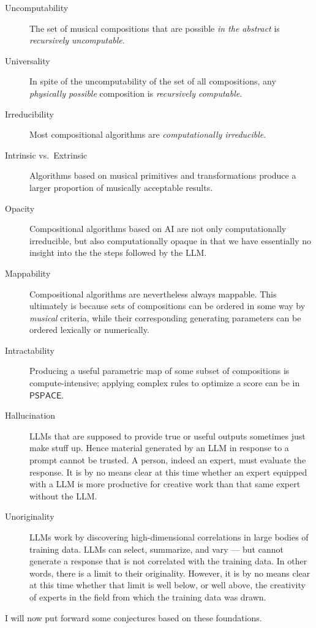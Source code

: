\documentclass[]{interact}
\theoremstyle{plain}%
\theoremstyle{definition}
\theoremstyle{remark}
\begin{document}
\begin{description}
\item[Uncomputability] The set of musical compositions that are possible \emph{in the abstract} is \emph{recursively uncomputable}.
\item[Universality] In spite of the uncomputability of the set of all compositions, any \emph{physically possible} composition is \emph{recursively computable}.
\item[Irreducibility] Most compositional algorithms are \emph{computationally irreducible}.
\item[Intrinsic vs.\ Extrinsic] Algorithms based on musical primitives and transformations produce a larger proportion of musically acceptable results.
\item[Opacity] Compositional algorithms based on AI are not only computationally irreducible, but also computationally opaque in that we have essentially no insight into the the steps followed by the LLM.
\item[Mappability] Compositional algorithms are nevertheless always mappable. This ultimately is because sets of compositions can be ordered in some way by \emph{musical} criteria, while their corresponding generating parameters can be ordered lexically or numerically.
\item[Intractability] Producing a useful parametric map of some subset of compositions is compute-intensive; applying complex rules to optimize a score can be in $\mathsf{PSPACE}$.
\item[Hallucination] LLMs that are supposed to provide true or useful outputs sometimes just make stuff up. Hence material generated by an LLM in response to a prompt cannot be trusted. A person, indeed an expert, must evaluate the response. It is by no means clear at this time whether an expert equipped with a LLM is more productive for creative work than that same expert without the LLM.
\item[Unoriginality] LLMs work by discovering high-dimensional correlations in large bodies of training data. LLMs can select, summarize, and vary --- but cannot generate a response that is not correlated with the training data. In other words, there is a limit to their originality. However, it is by no means clear at this time whether that limit is well below, or well above, the creativity of experts in the field from which the training data was drawn.
\end{description}

I will now put forward some conjectures based on these foundations.
\end{document}
